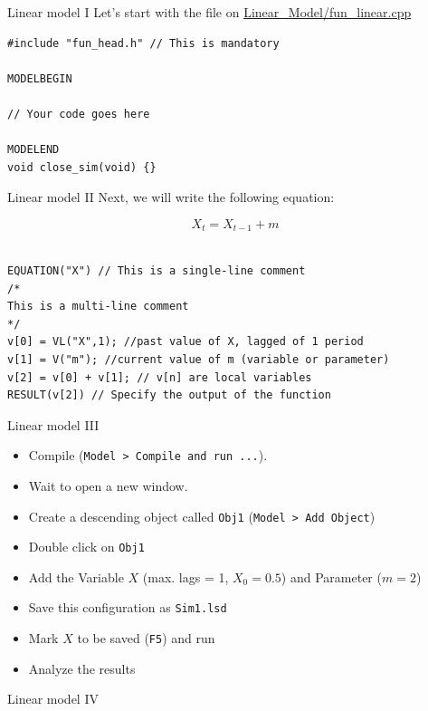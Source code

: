 \documentclass[bigger,aspectratio=169]{beamer}
\begin{document}
\begin{frame}[label={sec:orge29a142},fragile]{Linear model I}
 Let's start with the file on \url{Linear\_Model/fun\_linear.cpp}


\begin{verbatim}
#include "fun_head.h" // This is mandatory

MODELBEGIN

// Your code goes here

MODELEND
void close_sim(void) {}
\end{verbatim}
\end{frame}
\begin{frame}[label={sec:orge038a3c},fragile]{Linear model II}
 Next, we will write the following equation:

\[X_{t} = X_{t-1} + m\]


\begin{verbatim}

EQUATION("X") // This is a single-line comment
/*
This is a multi-line comment
*/
v[0] = VL("X",1); //past value of X, lagged of 1 period
v[1] = V("m"); //current value of m (variable or parameter)
v[2] = v[0] + v[1]; // v[n] are local variables
RESULT(v[2]) // Specify the output of the function
\end{verbatim}
\end{frame}
\begin{frame}[label={sec:org1577ec6},fragile]{Linear model III}
 \begin{itemize}
\item Compile (\texttt{Model > Compile and run ...}).
\item Wait to open a new window.
\item Create a descending object called \texttt{Obj1} (\texttt{Model > Add Object})
\item Double click on \texttt{Obj1}
\item Add the Variable \(X\) (max. lags = 1, \(X_{0} = 0.5\)) and Parameter (\(m = 2\))
\item Save this configuration as \texttt{Sim1.lsd}
\item Mark \(X\) to be saved (\texttt{F5}) and run
\item Analyze the results
\end{itemize}
\end{frame}
\begin{frame}[label={sec:org010954e}]{Linear model IV}
\begin{center}

\end{center}
\end{frame}
\end{document}
